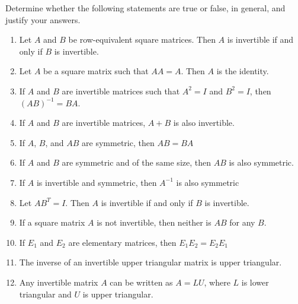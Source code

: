\begin{exercise} \label{E.1.29}
    Determine whether the following statements are true or false, in general, and justify your answers.
    
    \begin{enumerate}
        \item Let \( A \) and \( B \) be row-equivalent square matrices. Then \( A \) is invertible if and only if \( B \) is invertible.
        
        \item Let \( A \) be a square matrix such that \( AA = A \). Then \( A \) is the identity.
        
        \item If \( A \) and \( B \) are invertible matrices such that \( A^2 = I \) and \( B^2 = I \), then \( (AB)^{-1} = BA \).
        
        \item If \( A \) and \( B \) are invertible matrices, \( A + B \) is also invertible.
        
        \item If \( A \), \( B \), and \( AB \) are symmetric, then \( AB = BA \)
        
        \item If \( A \) and \( B \) are symmetric and of the same size, then \( AB \) is also symmetric.
        
        \item If \( A \) is invertible and symmetric, then \( A^{-1} \) is also symmetric
        
        \item Let \( AB^T = I \). Then \( A \) is invertible if and only if \( B \) is invertible.
        
        \item If a square matrix \( A \) is not invertible, then neither is \( AB \) for any \( B \).
        
        \item If \( E_1 \) and \( E_2 \) are elementary matrices, then \( E_1E_2 = E_2E_1 \)
        
        \item The inverse of an invertible upper triangular matrix is upper triangular.
        
        \item Any invertible matrix \( A \) can be written as \( A = LU \), where \( L \) is lower triangular and \( U \) is upper triangular.
    \end{enumerate}
    

\end{exercise}
